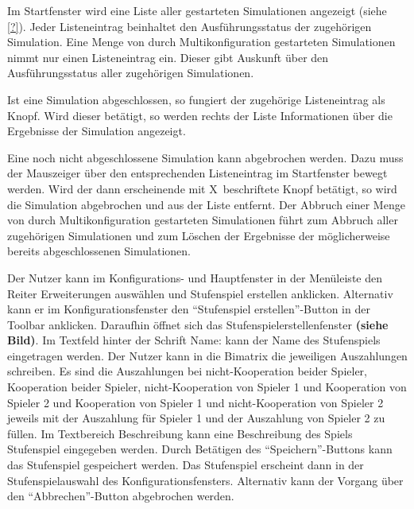 \documentclass[parskip=full,11pt]{scrartcl}
\begin{document}
Im Startfenster wird eine Liste aller gestarteten Simulationen angezeigt (siehe \cref{?}). Jeder Listeneintrag beinhaltet den Ausführungsstatus der zugehörigen Simulation. Eine Menge von durch Multikonfiguration gestarteten Simulationen nimmt nur einen Listeneintrag ein. Dieser gibt Auskunft über den Ausführungsstatus aller zugehörigen Simulationen.

Ist eine Simulation abgeschlossen, so fungiert der zugehörige Listeneintrag als Knopf. Wird dieser betätigt, so werden rechts der Liste Informationen über die Ergebnisse der Simulation angezeigt.

Eine noch nicht abgeschlossene Simulation kann abgebrochen werden. Dazu muss der Mauszeiger über den entsprechenden Listeneintrag im Startfenster bewegt werden. Wird der dann erscheinende mit \glqq X\grqq\ beschriftete Knopf betätigt, so wird die Simulation abgebrochen und aus der Liste entfernt. Der Abbruch einer Menge von durch Multikonfiguration gestarteten Simulationen führt zum Abbruch aller zugehörigen Simulationen und zum Löschen der Ergebnisse der möglicherweise bereits abgeschlossenen Simulationen.


Der Nutzer kann im Konfigurations- und Hauptfenster in der Menüleiste den Reiter Erweiterungen auswählen und Stufenspiel erstellen anklicken. Alternativ kann er im Konfigurationsfenster den \enquote{Stufenspiel erstellen}-Button in der Toolbar anklicken. Daraufhin öffnet sich das Stufenspielerstellenfenster \textbf{(siehe Bild)}. Im Textfeld hinter der Schrift Name: kann der Name des Stufenspiels eingetragen werden. Der Nutzer kann in die Bimatrix die jeweiligen Auszahlungen schreiben. Es sind die Auszahlungen bei nicht-Kooperation beider Spieler, Kooperation beider Spieler, nicht-Kooperation von Spieler 1 und Kooperation von Spieler 2 und Kooperation von Spieler 1 und nicht-Kooperation von Spieler 2 jeweils mit der Auszahlung für Spieler 1 und der Auszahlung von Spieler 2 zu füllen. Im Textbereich Beschreibung kann eine Beschreibung des Spiels Stufenspiel eingegeben werden. Durch Betätigen des \enquote{Speichern}-Buttons kann das Stufenspiel gespeichert werden. Das Stufenspiel erscheint dann in der Stufenspielauswahl des Konfigurationsfensters. Alternativ kann der Vorgang über den \enquote{Abbrechen}-Button abgebrochen werden.
\end{document}
